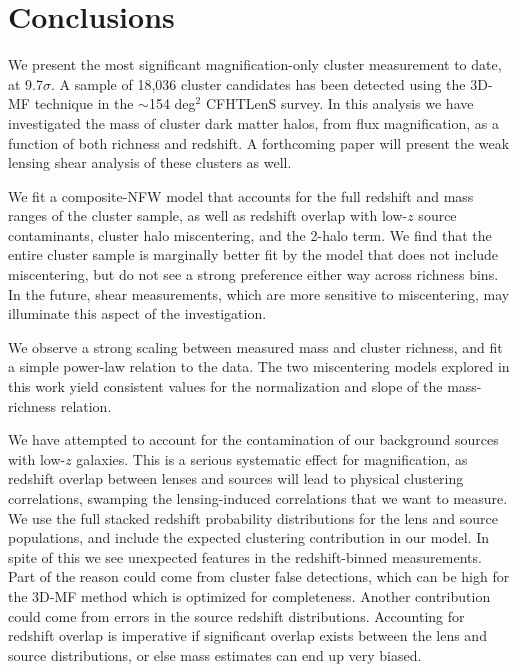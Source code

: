 
\section{Conclusions}
\label{conc}
We present the most significant magnification-only cluster measurement to date, at 9.7$\sigma$. A sample of 18,036 cluster candidates has been detected using the \ac{3D-MF} technique in the $\sim$154 deg$^2$ \ac{CFHTLenS} survey. In this analysis we have investigated the mass of cluster dark matter halos, from flux magnification, as a function of both richness and redshift. A forthcoming paper will present the weak lensing shear analysis of these clusters as well.

We fit a composite-\ac{NFW} model that accounts for the full redshift and mass ranges of the cluster sample, as well as redshift overlap with low-$z$ source contaminants, cluster halo miscentering, and the 2-halo term. We find that the entire cluster sample is marginally better fit by the model that does not include miscentering, but do not see a strong preference either way across richness bins. In the future, shear measurements, which are more sensitive to miscentering, may illuminate this aspect of the investigation.

We observe a strong scaling between measured mass and cluster richness, and fit a simple power-law relation to the data. The two miscentering models explored in this work yield consistent values for the normalization and slope of the mass-richness relation.

We have attempted to account for the contamination of our background sources with low-$z$ galaxies. This is a serious systematic effect for magnification, as redshift overlap between lenses and sources will lead to physical clustering correlations, swamping the lensing-induced correlations that we want to measure. We use the full stacked redshift probability distributions for the lens and source populations, and include the expected clustering contribution in our model. In spite of this we see unexpected features in the redshift-binned measurements. Part of the reason could come from cluster false detections, which can be high for the \ac{3D-MF} method which is optimized for completeness. Another contribution could come from errors in the source redshift distributions. Accounting for redshift overlap is imperative if significant overlap exists between the lens and source distributions, or else mass estimates can end up very biased.

